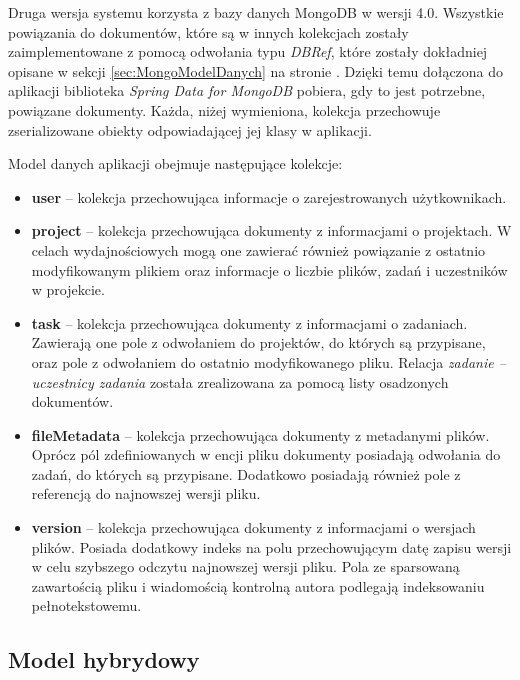 Druga wersja systemu korzysta z bazy danych MongoDB w wersji 4.0.
Wszystkie powiązania do dokumentów, które są w innych kolekcjach zostały zaimplementowane z pomocą odwołania typu \textit{DBRef}, które zostały dokładniej opisane w sekcji \ref{sec:MongoModelDanych} na stronie \pageref{sec:MongoModelDanych}.
Dzięki temu dołączona do aplikacji biblioteka \textit{Spring Data for MongoDB} pobiera, gdy to jest potrzebne, powiązane dokumenty. 
Każda, niżej wymieniona, kolekcja przechowuje zserializowane obiekty odpowiadającej jej klasy w aplikacji.

Model danych aplikacji obejmuje następujące kolekcje:
\begin{itemize}
    \item \textbf{user} -- kolekcja przechowująca informacje o zarejestrowanych użytkownikach.

    \item \textbf{project} -- kolekcja przechowująca dokumenty z informacjami o projektach.
    W celach wydajnościowych mogą one zawierać również powiązanie z ostatnio modyfikowanym plikiem oraz informacje o liczbie plików, zadań i uczestników w projekcie.
    
    \item \textbf{task} -- kolekcja przechowująca dokumenty z informacjami o zadaniach.
    Zawierają one pole z odwołaniem do projektów, do których są przypisane, oraz pole z odwołaniem do ostatnio modyfikowanego pliku.
    Relacja \textit{zadanie -- uczestnicy zadania} została zrealizowana za pomocą listy osadzonych dokumentów.
    
    \item \textbf{fileMetadata} -- kolekcja przechowująca dokumenty z metadanymi plików.
    Oprócz pól zdefiniowanych w encji pliku dokumenty posiadają odwołania do zadań, do których są przypisane.
    Dodatkowo posiadają również pole z referencją do najnowszej wersji pliku.
    
    \item \textbf{version} -- kolekcja przechowująca dokumenty z informacjami o wersjach plików.
    Posiada dodatkowy indeks na polu przechowującym datę zapisu wersji w celu szybszego odczytu najnowszej wersji pliku.
    Pola ze sparsowaną zawartością pliku i wiadomością kontrolną autora podlegają indeksowaniu pełnotekstowemu.
\end{itemize}

\subsection{Model hybrydowy} \label{sec:hybridModel}

